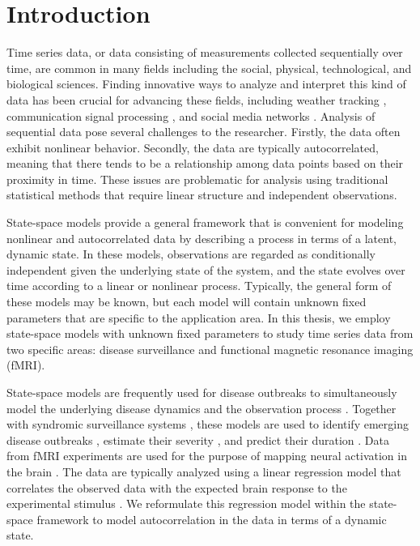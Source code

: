 \chapter{Introduction}

Time series data, or data consisting of measurements collected sequentially over time, are common in many fields including the social, physical, technological, and biological sciences. Finding innovative ways to analyze and interpret this kind of data has been crucial for advancing these fields, including weather tracking \citep{dixon:wiener:weather:1993}, communication signal processing \citep{gardner:signal:1994}, and social media networks \citep{smith:social:2009}. Analysis of sequential data pose several challenges to the researcher. Firstly, the data often exhibit nonlinear behavior. Secondly, the data are typically autocorrelated, meaning that there tends to be a relationship among data points based on their proximity in time. These issues are problematic for analysis using traditional statistical methods that require linear structure and independent observations.

State-space models provide a general framework that is convenient for modeling nonlinear and autocorrelated data by describing a process in terms of a latent, dynamic state. In these models, observations are regarded as conditionally independent given the underlying state of the system, and the state evolves over time according to a linear or nonlinear process. Typically, the general form of these models may be known, but each model will contain unknown fixed parameters that are specific to the application area. In this thesis, we employ state-space models with unknown fixed parameters to study time series data from two specific areas: disease surveillance and functional magnetic resonance imaging (fMRI).

State-space models are frequently used for disease outbreaks to simultaneously model the underlying disease dynamics and the observation process \citep{Mart:Cone:Lope:Lope:baye:2008, merl2009statistical, ludkovski2010optimal, skvortsov2012monitoring, unkel2012statistical, sheinson:niemi:meiring:epidtrack:2014}. Together with syndromic surveillance systems \citep{henning2004overview, wagner2006biosurveillance, wilson2006synsurveillance, hakenewerth2009north, Gins:Mohe:Pate:Bram:Smol:Bril:dete:2009}, these models are used to identify emerging disease outbreaks \citep{neill2006bayesian}, estimate their severity \citep{merl2009statistical}, and predict their duration \cite{ludkovski2010optimal}. Data from fMRI experiments are used for the purpose of mapping neural activation in the brain \citep{ashby:fmri:2011,kiebel:holmes:spm:2007,pold:fmri:2011}. The data are typically analyzed using a linear regression model that correlates the observed data with the expected brain response to the experimental stimulus \citep{friston:frith:JCBFM:1991,friston:holmes:hbm:1995}. We reformulate this regression model within the state-space framework to model autocorrelation in the data in terms of a dynamic state.

